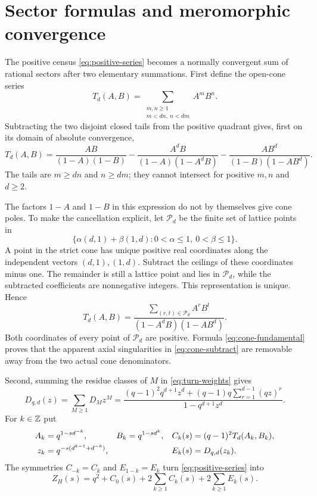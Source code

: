 \section{Sector formulas and meromorphic convergence}\label{sec:series}
The positive census \eqref{eq:positive-series} becomes a normally
convergent sum of rational sectors after two elementary summations.
First define the open-cone series
\begin{equation}\label{eq:cone}
 T_d(A,B)=\sum_{\substack{m,n\ge1\\m<dn,\ n<dm}}A^mB^n.
\end{equation}
Subtracting the two disjoint closed tails from the positive quadrant
gives, first on its domain of absolute convergence,
\begin{equation}\label{eq:cone-subtract}
 T_d(A,B)=\frac{AB}{(1-A)(1-B)}
 -\frac{A^dB}{(1-A)(1-A^dB)}
 -\frac{AB^d}{(1-B)(1-AB^d)}.
\end{equation}
The tails are $m\ge dn$ and $n\ge dm$; they cannot intersect
for positive $m,n$ and $d\ge2$.

The factors $1-A$ and $1-B$ in this expression do not by
themselves give cone poles. To make the cancellation explicit,
let $\mathcal P_d$ be the finite set of lattice points in
\[
 \{\alpha(d,1)+\beta(1,d):0<\alpha\le1,\ 0<\beta\le1\}.
\]
A point in the strict cone has unique positive real coordinates
along the independent vectors $(d,1),(1,d)$. Subtract the ceilings
of these coordinates minus one. The remainder is still a lattice
point and lies in $\mathcal P_d$, while the subtracted coefficients
are nonnegative integers. This representation is unique. Hence
\begin{equation}\label{eq:cone-fundamental}
 T_d(A,B)=
 \frac{\displaystyle\sum_{(r,t)\in\mathcal P_d}A^rB^t}
 {(1-A^dB)(1-AB^d)}.
\end{equation}
Both coordinates of every point of $\mathcal P_d$ are positive.
Formula \eqref{eq:cone-fundamental} proves that the apparent
axial singularities in \eqref{eq:cone-subtract} are removable
away from the two actual cone denominators.

Second, summing the residue classes of $M$ in
\eqref{eq:turn-weights} gives
\begin{equation}\label{eq:turn-generating}
 D_{q,d}(z)=\sum_{M\ge1}D_Mz^M
 =\frac{(q-1)^2q^{d+1}z^d+
 (q-1)q\displaystyle\sum_{r=1}^{d-1}(qz)^r}
 {1-q^{d+1}z^d}.
\end{equation}
For $k\in\mathbb Z$ put
\begin{align}\label{eq:sectors}
 A_k&=q^{1-sd^{-k}},& B_k&=q^{1-sd^k},&
 C_k(s)&=(q-1)^2T_d(A_k,B_k),\notag\\
 z_k&=q^{-s(d^{k-1}+d^{-k})},&&&
 E_k(s)&=D_{q,d}(z_k).
\end{align}
The symmetries $C_{-k}=C_k$ and $E_{1-k}=E_k$ turn
\eqref{eq:positive-series} into
\begin{equation}\label{eq:sector-sum}
 Z_H(s)=q^2+C_0(s)+2\sum_{k\ge1}C_k(s)
                    +2\sum_{k\ge1}E_k(s).
\end{equation}

